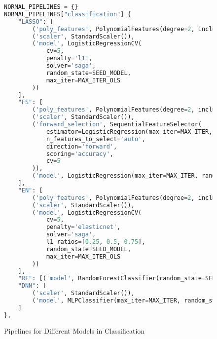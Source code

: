 \documentclass{article}
\numberwithin{equation}{section}
\begin{document}
\begin{figure}[H]
\begin{lstlisting}[language=python]
NORMAL_PIPELINES = {}
NORMAL_PIPELINES["classification"] {
    "LASSO": [
        ('poly_features', PolynomialFeatures(degree=2, include_bias=False)),
        ('scaler', StandardScaler()),
        ('model', LogisticRegressionCV(
            cv=5,
            penalty='l1',
            solver='saga',
            random_state=SEED_MODEL,
            max_iter=MAX_ITER_OLS
        ))
    ],
    "FS": [
        ('poly_features', PolynomialFeatures(degree=2, include_bias=False)),
        ('scaler', StandardScaler()),
        ('forward_selection', SequentialFeatureSelector(
            estimator=LogisticRegression(max_iter=MAX_ITER, random_state=SEED_MODEL),
            n_features_to_select='auto',
            direction='forward',
            scoring='accuracy',
            cv=5
        )),
        ('model', LogisticRegression(max_iter=MAX_ITER, random_state=SEED_MODEL))
    ],
    "EN": [
        ('poly_features', PolynomialFeatures(degree=2, include_bias=False)),
        ('scaler', StandardScaler()),
        ('model', LogisticRegressionCV(
            cv=5,
            penalty='elasticnet',
            solver='saga',
            l1_ratios=[0.25, 0.5, 0.75],
            random_state=SEED_MODEL,
            max_iter=MAX_ITER_OLS
        ))
    ],
    "RF": [('model', RandomForestClassifier(random_state=SEED_MODEL))],
    "DNN": [
        ('scaler', StandardScaler()),
        ('model', MLPClassifier(max_iter=MAX_ITER, random_state=SEED_MODEL, activation='relu', learning_rate='adaptive'))
    ]
},
\end{lstlisting}
\caption{Pipelines for Different Models in Classification}
\end{figure}
\end{document}
